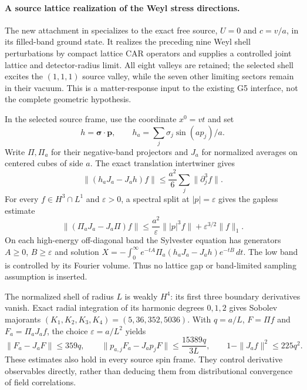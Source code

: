 \paragraph{A source lattice realization of the Weyl stress directions.}
The new attachment in 
specializes to the exact free source, $U=0$ and $c=v/a$, in its filled-band
ground state. It realizes the preceding nine Weyl shell perturbations by
compact lattice CAR operators and supplies a controlled joint lattice and
detector-radius limit. All eight valleys are retained; the selected shell
excites the $(1,1,1)$ source valley, while the seven other limiting sectors
remain in their vacuum. This is a matter-response input to the existing
G5 interface, not the complete geometric hypothesis.

In the selected source frame, use the coordinate $x^0=vt$ and set
\[
 h=\boldsymbol\sigma\cdot\boldsymbol p,\qquad
 h_a=\sum_j\sigma_j\sin(ap_j)/a.
\]
Write $\Pi,\Pi_a$ for their negative-band projectors and $J_a$ for
normalized averages on centered cubes of side $a$.
The exact translation intertwiner gives
\[
 \|(h_aJ_a-J_ah)f\|
 \leq \frac{a^2}{6}\sum_j\|\partial_j^3f\|.
\]
For every $f\in H^3\cap L^1$ and $\varepsilon>0$, a spectral split at
$|p|=\varepsilon$ gives the gapless estimate
\[
 \|(\Pi_aJ_a-J_a\Pi)f\|
 \leq \frac{a^2}{\varepsilon}\||p|^3f\|
       +\varepsilon^{3/2}\|f\|_1 .
\]
On each high-energy off-diagonal band the Sylvester equation has
generators $A\geq0$, $B\geq\varepsilon$ and solution
$X=-\int_0^\infty e^{-tA}\Pi_a(h_aJ_a-J_ah)e^{-tB}\,dt$.
The low band is controlled by its Fourier volume. Thus no lattice gap or
band-limited sampling assumption is inserted.

The normalized shell of radius $L$ is weakly $H^4$: its first three
boundary derivatives vanish. Exact radial integration of its harmonic
degrees $0,1,2$ gives Sobolev majorants
$(K_1,K_2,K_3,K_4)=(5,36,352,5036)$. With $q=a/L$, $F=\Pi f$ and
$F_a=\Pi_aJ_af$, the choice $\varepsilon=a/L^2$ yields
\[
 \|F_a-J_aF\|\leq359q,\qquad
 \|p_{a,j}F_a-J_ap_jF\|\leq\frac{15389q}{3L},\qquad
 1-\|J_af\|^2\leq225q^2.
\]
These estimates also hold in every source spin frame. They control
derivative observables directly, rather than deducing them from
distributional convergence of field correlations.


